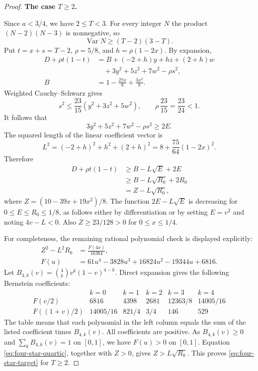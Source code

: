 \begin{proof}
\medskip\noindent\textbf{The case $T\ge2$.}

Since $a<3/4$, we have $2\le T<3$.
For every integer $N$ the product $(N-2)(N-3)$ is nonnegative,
so
\[
 \operatorname{Var}N\ge(T-2)(3-T).
\]
Put $t=x+s=T-2$, $\rho=5/8$, and $h=\rho(1-2x)$.
By expansion,
\[
 \begin{split}
 D+\rho t(1-t)
 &=B+(-2+h)y+hz+(2+h)w\\
 &\quad+3y^2+5z^2+7w^2-\rho s^2,\\
 B&=1-\frac{27x}{8}+\frac{3x^2}{8}.
 \end{split}
\]
Weighted Cauchy--Schwarz gives
\[
 s^2\le\frac{23}{15}(y^2+3z^2+5w^2),
 \qquad \rho\,\frac{23}{15}=\frac{23}{24}<1.
\]
It follows that
\[
 3y^2+5z^2+7w^2-\rho s^2\ge2E.
\]
The squared length of the linear coefficient vector is
\[
 L^2=(-2+h)^2+h^2+(2+h)^2
     =8+\frac{75}{64}(1-2x)^2.
\]
Therefore
\[
 \begin{aligned}
 D+\rho t(1-t)&\ge B-L\sqrt E+2E\\
              &\ge B-L\sqrt{R_0}+2R_0\\
              &=Z-L\sqrt{R_0},
 \end{aligned}
\]
where $Z=(10-39x+19x^2)/8$.
The function $2E-L\sqrt E$ is decreasing for $0\le E\le R_0\le1/8$,
as follows either by differentiation or by setting $E=v^2$
and noting $4v-L<0$.  Also $Z\ge23/128>0$ for
$0\le x\le1/4$.

For completeness, the remaining rational polynomial check is
displayed explicitly:
\begin{equation}\label{eq:four-star-quartic}
 \begin{aligned}
 Z^2-L^2R_0&=\frac{F(4x)}{16384},\\
 F(u)&=61u^4-3828u^3+16824u^2-19344u+6816.
 \end{aligned}
\end{equation}
Let $B_{4,k}(v)=\binom4k v^k(1-v)^{4-k}$.
Direct expansion gives the following Bernstein coefficients:
\[
 \begin{array}{c|rrrrr}
  &k=0&k=1&k=2&k=3&k=4\\ \hline
 F(v/2)&6816&4398&2681&12363/8&14005/16\\
 F((1+v)/2)&14005/16&821/4&3/4&146&529
 \end{array}
\]
The table means that each polynomial in the left column equals
the sum of the listed coefficient times $B_{4,k}(v)$.
All coefficients are positive.  As $B_{4,k}(v)\ge0$ and
$\sum_kB_{4,k}(v)=1$ on $[0,1]$, we have $F(u)>0$ on $[0,1]$.
Equation \eqref{eq:four-star-quartic}, together with $Z>0$, gives
$Z>L\sqrt{R_0}$.  This proves \eqref{eq:four-star-target} for $T\ge2$.


\end{proof}
